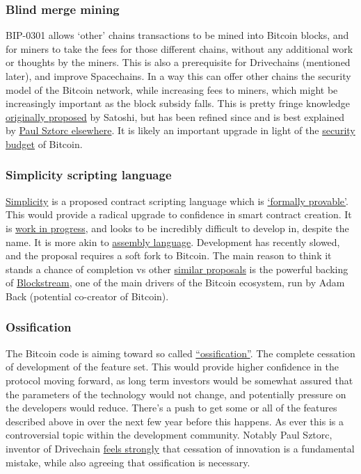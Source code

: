 \subsubsection{Blind merge mining}
BIP-0301 allows `other' chains transactions to be mined into Bitcoin blocks, and for miners to take the fees for those different chains, without any additional work or thoughts by the miners. This is also a prerequisite for Drivechains (mentioned later), and improve Spacechains. In a way this can offer other chains the security model of the Bitcoin network, while increasing fees to miners, which might be increasingly important as the block subsidy falls. This is pretty fringe knowledge \href{https://bitcointalk.org/index.php?topic=1790.msg28696#msg28696}{originally proposed} by Satoshi, but has been refined since and is best explained by \href{https://www.youtube.com/watch?v=xweFaw69EyA}{Paul Sztorc elsewhere}. It is likely an important upgrade in light of the \href{https://www.truthcoin.info/blog/security-budget/}{security budget} of Bitcoin.
\subsubsection{Simplicity scripting language}
\href{https://blockstream.com/simplicity.pdf}{Simplicity} is a proposed contract scripting language which is \href{https://coq.inria.fr/}{`formally provable'}. This would provide a radical upgrade to confidence in smart contract creation. It is \href{https://github.com/ElementsProject/simplicity/blob/pdf/Simplicity-TR.pdf}{work in progress}, and looks to be incredibly difficult to develop in, despite the name. It is more akin to \href{https://en.wikipedia.org/wiki/Assembly_language}{assembly language}. Development has recently slowed, and the proposal requires a soft fork to Bitcoin. The main reason to think it stands a chance of completion vs other \href{https://lists.linuxfoundation.org/pipermail/bitcoin-dev/2022-March/020036.html}{similar proposals} is the powerful backing of \href{https://blockstream.com/}{Blockstream}, one of the main drivers of the Bitcoin ecosystem, run by Adam Back (potential co-creator of Bitcoin). 
\subsubsection{Ossification}
The Bitcoin code is aiming toward so called \href{https://en.wikipedia.org/wiki/Protocol_ossification}{``ossification''}. The complete cessation of development of the feature set. This would provide higher confidence in the protocol moving forward, as long term investors would be somewhat assured that the parameters of the technology would not change, and potentially pressure on the developers would reduce. There's a push to get some or all of the features described above in over the next few year before this happens. As ever this is a controversial topic within the development community. Notably Paul Sztorc, inventor of Drivechain \href{https://www.truthcoin.info/blog/sc-vision/}{feels strongly} that cessation of innovation is a fundamental mistake, while also agreeing that ossification is necessary.
